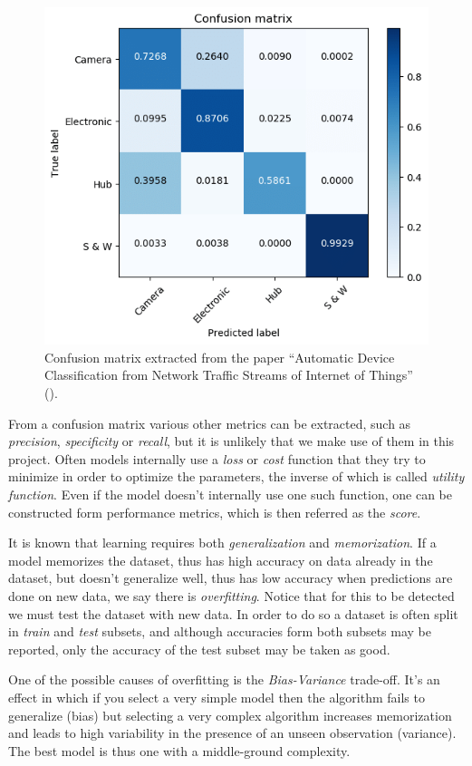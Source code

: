 \begin{figure}[H]
    \centering
    \includegraphics[width=0.5\linewidth]{img/ch4/confusion.png}
    \caption{Confusion matrix extracted from the paper “Automatic Device Classification from Network Traffic Streams of Internet of Things” (\cite{bai_automatic_2018}).}
    \label{fig:ch4.confusion}
\end{figure}

From a confusion matrix various other metrics can be extracted, such as \emph{precision}, \emph{specificity} or \emph{recall}, but it is unlikely that we make use of them in this project. Often models internally use a \emph{loss} or \emph{cost} function that they try to minimize in order to optimize the parameters, the inverse of which is called \emph{utility function}. Even if the model doesn't internally use one such function, one can be constructed form performance metrics, which is then referred as the \emph{score}. 

It is known that learning requires both \emph{generalization} and \emph{memorization}. If a model memorizes the dataset, thus has high accuracy on data already in the dataset, but doesn't generalize well, thus has low accuracy when predictions are done on new data, we say there is \emph{overfitting}. Notice that for this to be detected we must test the dataset with new data. In order to do so a dataset is often split in \emph{train} and \emph{test} subsets, and although accuracies form both subsets may be reported, only the accuracy of the test subset may be taken as good.

One of the possible causes of overfitting is the \emph{Bias-Variance} trade-off. It's an effect in which if you select a very simple model then the algorithm fails to generalize (bias) but selecting a very complex algorithm increases memorization and leads to high variability in the presence of an unseen observation (variance). The best model is thus one with a middle-ground complexity.

